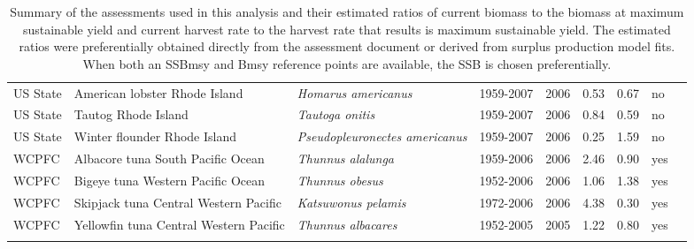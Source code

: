 \begin{longtable}{p{1.8cm}p{4cm}p{4cm}ccccp{1.9cm}c}
  US State & American lobster Rhode Island & \textit{Homarus americanus} & 1959-2007 & 2006 & 0.53 & 0.67 & no & \cite{RIDEM-LOBSTERRI-1959-2007-COLLIE} \\ 
  US State & Tautog Rhode Island & \textit{Tautoga onitis} & 1959-2007 & 2006 & 0.84 & 0.59 & no & \cite{RIDEM-TAUTOGRI-1959-2007-COLLIE} \\ 
  US State & Winter flounder Rhode Island & \textit{Pseudopleuronectes americanus} & 1959-2007 & 2006 & 0.25 & 1.59 & no & \cite{RIDEM-WINFLOUNDRI-1959-2007-COLLIE} \\ 
  WCPFC & Albacore tuna South Pacific Ocean & \textit{Thunnus alalunga} & 1959-2006 & 2006 & 2.46 & 0.90 & yes & \cite{SPC-ALBASPAC-1959-2006-JENSEN} \\ 
  WCPFC & Bigeye tuna Western Pacific Ocean & \textit{Thunnus obesus} & 1952-2006 & 2006 & 1.06 & 1.38 & yes & \cite{SPC-BIGEYEWPO-1952-2006-JENSEN} \\ 
  WCPFC & Skipjack tuna Central Western Pacific & \textit{Katsuwonus pelamis} & 1972-2006 & 2006 & 4.38 & 0.30 & yes & \cite{SPC-SKJCWPAC-1972-2006-JENSEN} \\ 
  WCPFC & Yellowfin tuna Central Western Pacific & \textit{Thunnus albacares} & 1952-2005 & 2005 & 1.22 & 0.80 & yes & \cite{SPC-YFINCWPAC-1952-2005-JENSEN} \\ 
   \hline
\hline
\caption{Summary of the assessments used in this analysis and their estimated ratios of current biomass to the biomass at maximum sustainable yield and current harvest rate to the harvest rate that results is maximum sustainable yield. The estimated ratios were preferentially obtained directly from the assessment document or derived from surplus production model fits. When both an SSBmsy and Bmsy reference points are available, the SSB is chosen preferentially.}
\label{tab:crosshair}
\end{longtable}
